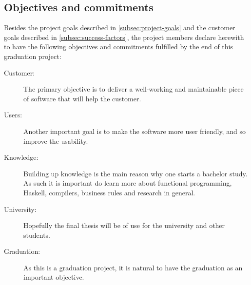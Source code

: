 \subsection{Objectives and commitments}
Besides the project goals described in \autoref{subsec:project-goals} and the customer goals described in \autoref{subsec:success-factors}, the project members declare herewith to have the following objectives and commitments fulfilled by the end of this graduation project:
\begin{description}
	\item[Customer:] The primary objective is to deliver a well-working and maintainable piece of software that will help the customer.
	\item[Users:] Another important goal is to make the software more user friendly, and so improve the usability.
	\item[Knowledge:] Building up knowledge is the main reason why one starts a bachelor study.
		As such it is important do learn more about functional programming, Haskell, compilers, business rules and research in general.
	\item[University:] Hopefully the final thesis will be of use for the university and other students.
	\item[Graduation:] As this is a graduation project, it is natural to have the graduation as an important objective.
\end{description}
